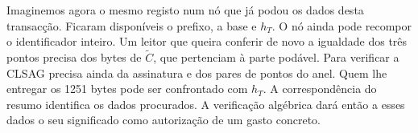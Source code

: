 Imaginemos agora o mesmo registo num nó que já podou os dados desta
transacção. Ficaram disponíveis o prefixo, a base e \(h_T\). O nó
ainda pode recompor o identificador inteiro. Um leitor que queira
conferir de novo a igualdade dos três pontos precisa dos bytes de
\(\widetilde C\), que pertenciam à parte podável. Para verificar a
CLSAG precisa ainda da assinatura e dos pares de pontos do anel.
Quem lhe entregar os 1251 bytes pode ser confrontado com \(h_T\).
A correspondência do resumo identifica os dados procurados. A
verificação algébrica dará então a esses dados o seu significado
como autorização de um gasto concreto.
